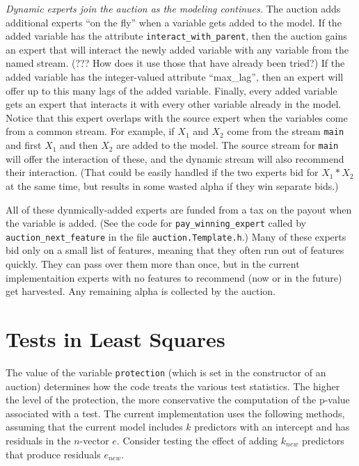 \documentclass[12pt]{article}
\begin{document}
 {\em Dynamic experts join the auction as the modeling continues.}  The auction
 adds additional experts ``on the fly'' when a variable gets added to the model.
  If the added variable has the attribute {\tt interact\_with\_parent}, then the
 auction gains an expert that will interact the newly added variable with any
 variable from the named stream. (??? How does it use those that have already
 been tried?)  If the added variable has the integer-valued attribute
 ``max\_lag'', then an expert will offer up to this many lags of the added
 variable.  Finally, every added variable gets an expert that interacts it with
 every other variable already in the model.  Notice that this expert overlaps
 with the source expert when the variables come from a common stream.  For
 example, if $X_1$ and $X_2$ come from the stream {\tt main} and first $X_1$ and
 then $X_2$ are added to the model. The source stream for {\tt main} will offer
 the interaction of these, and the dynamic stream will also recommend their
 interaction.  (That could be easily handled if the two experts bid for $X_1 *
 X_2$ at the same time, but results in some wasted alpha if they win separate
 bids.)

 All of these dynmically-added experts are funded from a tax on the payout when
 the variable is added.  (See the code for {\tt pay\_winning\_expert} called by
 {\tt auction\_next\_feature} in the file {\tt auction.Template.h}.)  Many of
 these experts bid only on a small list of features, meaning that they often run
 out of features quickly.  They can pass over them more than once, but in the
 current implementaition experts with no features to recommend (now or in the
 future) get harvested.  Any remaining alpha is collected by the auction.


\section{Tests in Least Squares} %

 The value of the variable {\tt protection} (which is set in the constructor of
 an auction) determines how the code treats the various test statistics.  The
 higher the level of the protection, the more conservative the computation of
 the p-value associated with a test.  The current implementation uses the
 following methods, assuming that the current model includes $k$ predictors
 with an intercept and has residuals in the $n$-vector $e$.  Consider testing
 the effect of adding $k_{new}$ predictors that produce residuals $e_{new}$.
\end{document}
